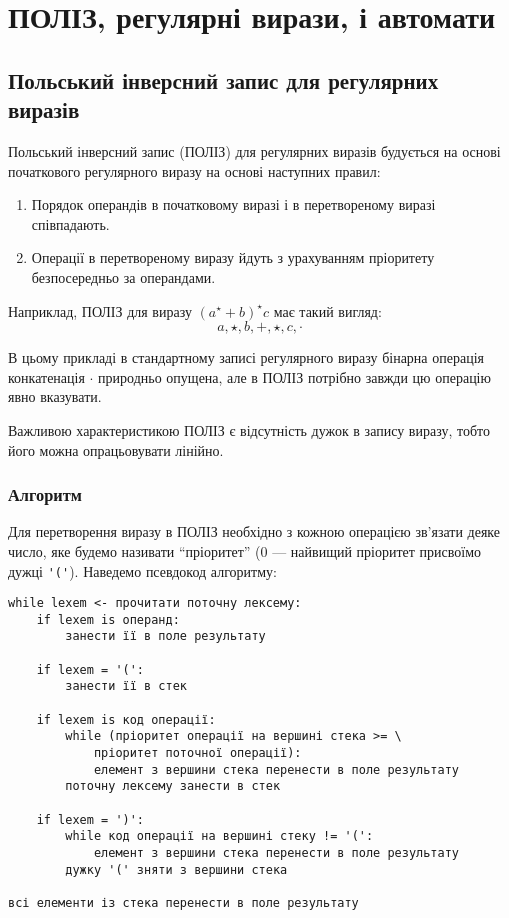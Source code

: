 \setcounter{section}{5}

\section{ПОЛІЗ, регулярні вирази, і автомати}

\subsection{Польський інверсний запис для регулярних виразів}

Польський інверсний запис (ПОЛІЗ) для регулярних виразів будується на основі початкового регулярного виразу на основі наступних правил:
\begin{enumerate}
	\item Порядок операндів в початковому виразі і в перетвореному виразі співпадають.
	\item Операції в перетвореному виразу йдуть з урахуванням пріоритету безпосередньо за операндами.
\end{enumerate}

Наприклад, ПОЛІЗ для виразу $(a^\star+b)^\star c$ має такий вигляд:
\begin{equation}
    a, \star, b, +, \star, c, \cdot
\end{equation}

В цьому прикладі в стандартному записі регулярного виразу бінарна операція конкатенація $\cdot$ природньо опущена, але в ПОЛІЗ потрібно завжди цю операцію явно вказувати. \medskip

Важливою характеристикою ПОЛІЗ є відсутність дужок в запису виразу, тобто його можна опрацьовувати лінійно.

\subsubsection{Алгоритм}

Для перетворення виразу в ПОЛІЗ необхідно з кожною операцією зв'я\-за\-ти деяке число, яке будемо називати ``пріоритет'' (0 --- найвищий пріоритет присвоїмо дужці \verb|'('|). Наведемо псевдокод алгоритму:
\begin{verbatim}
while lexem <- прочитати поточну лексему:
    if lexem is операнд:
        занести її в поле результату
	
    if lexem = '(':
        занести її в стек
	
    if lexem is код операції:
        while (пріоритет операції на вершині стека >= \
        	пріоритет поточної операції):
            елемент з вершини стека перенести в поле результату
        поточну лексему занести в стек
	
    if lexem = ')':
        while код операції на вершині стеку != '(':
            елемент з вершини стека перенести в поле результату
        дужку '(' зняти з вершини стека

всі елементи із стека перенести в поле результату
\end{verbatim}


